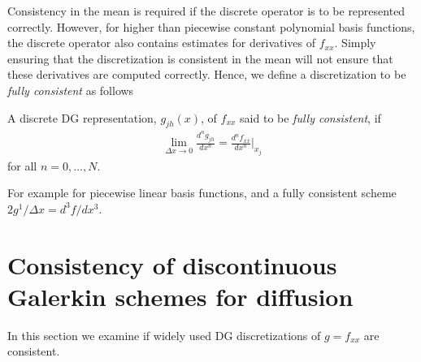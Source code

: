 \documentclass[final]{siamltex}
\begin{document}
Consistency in the mean is required if the discrete operator is to be
represented correctly. However, for higher than piecewise constant
polynomial basis functions, the discrete operator also contains
estimates for derivatives of $f_{xx}$. Simply ensuring that the
discretization is consistent in the mean will not ensure that these
derivatives are computed correctly. Hence, we define a discretization
to be \emph{fully consistent} as follows
\begin{definition}
  A discrete DG representation, $g_{jh}(x)$, of $f_{xx}$ said to be
  \emph{fully consistent}, if
  \begin{align}
    \lim_{\Delta x \rightarrow 0} \frac{d^ng_{jh}}{dx^n} =
    \frac{d^nf_{xx}}{dx^n} \biggr|_{x_j}
  \end{align}
for all $n=0,\ldots,N$.
\end{definition}

For example for piecewise linear basis functions, and a fully
consistent scheme $2g^1/\Delta x = d^3f/dx^3$. 

\section{Consistency of discontinuous Galerkin schemes for diffusion}

In this section we examine if widely used DG discretizations of
$g=f_{xx}$ are consistent.



\end{document}
